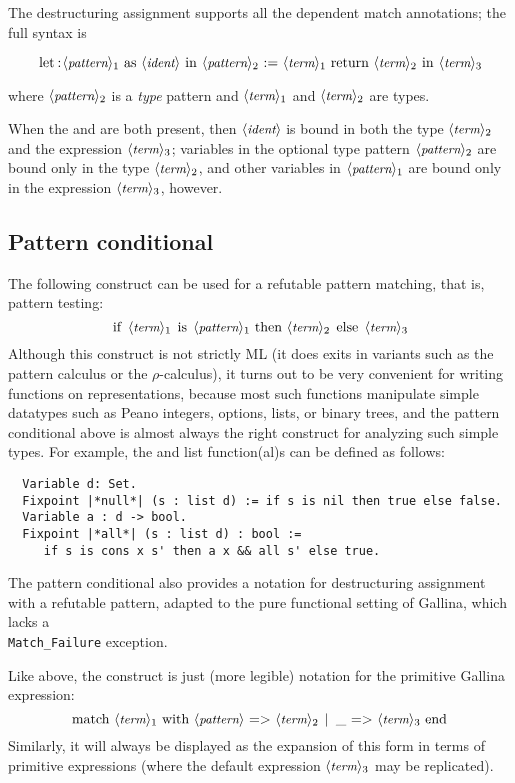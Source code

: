 The \ssr{} destructuring assignment supports all the dependent match
annotations; the  full syntax is

\[ \C{let:} \N{pattern}_1\ \C{as}\ \N{ident}\ \C{in}\ \N{pattern}_2\ \C{:=}\ \N{term}_1\ \C{return}\ \N{term}_2\ \C{in}\ \N{term}_3\]

where $\langle\mbox{\itshape\rmfamily\small pattern}\rangle_2$ is a \emph{type} pattern and $\langle\mbox{\itshape\rmfamily\small term}\rangle_1$ and
$\langle\mbox{\itshape\rmfamily\small term}\rangle_2$ are types.

When the  and  are both present, then $\langle\mbox{\itshape\rmfamily\small ident}\rangle$ is bound
in both the type $\langle\mbox{\itshape\rmfamily\small term}\rangle_2$ and the expression $\langle\mbox{\itshape\rmfamily\small term}\rangle_3$;
variables in the optional type pattern $\langle\mbox{\itshape\rmfamily\small pattern}\rangle_2$ are
bound only in the type $\langle\mbox{\itshape\rmfamily\small term}\rangle_2$, and other variables in $\langle\mbox{\itshape\rmfamily\small pattern}\rangle_1$ are
bound only in the expression $\langle\mbox{\itshape\rmfamily\small term}\rangle_3$, however.

\subsection{Pattern conditional}\label{ssec:patcond}
The following construct can be used for a refutable pattern matching,
that is, pattern testing:
\[\C{if}\ \N{term}_1\ \C{is}\ \N{pattern}_1\ \C{then}\ \N{term}_2\ \C{else}
\ \N{term}_3\]
Although this construct is not strictly ML (it does exits in variants
such as the pattern calculus or the $\rho$-calculus), it turns out to be
very convenient for writing functions on representations,
because most such functions manipulate simple datatypes such as Peano
integers, options,
lists, or binary trees, and the pattern conditional above is almost
always the right construct
for analyzing such simple types. For example, the  and
 list function(al)s can be defined as follows:
\begin{lstlisting}
  Variable d: Set.
  Fixpoint |*null*| (s : list d) := if s is nil then true else false.
  Variable a : d -> bool.
  Fixpoint |*all*| (s : list d) : bool :=
     if s is cons x s' then a x && all s' else true.
\end{lstlisting}

The pattern conditional also provides a notation for destructuring
assignment with a refutable pattern, adapted to the pure functional
setting of Gallina, which lacks a \\\texttt{Match\_Failure} exception.

Like  above, the  construct is just (more legible)
notation for the primitive Gallina expression:
\[\C{match}\ \N{term}_1\ \C{with}\ \N{pattern}\ \C{=>}\ \N{term}_2\ \C{| _ =>}\ \N{term}_3\ \C{end}\]
Similarly, it will always be displayed as the expansion of this form
in terms of primitive  expressions (where the default
expression $\langle\mbox{\itshape\rmfamily\small term}\rangle_3$ may be replicated).


